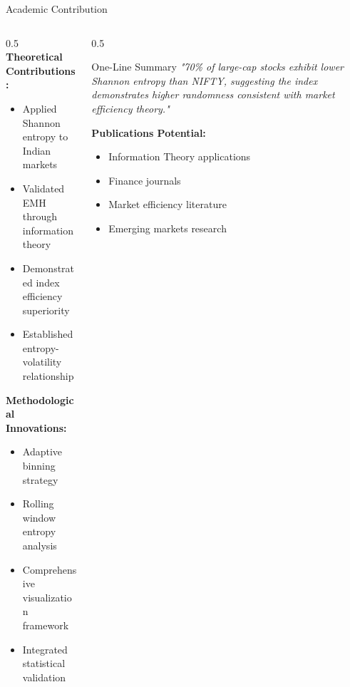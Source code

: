\documentclass[aspectratio=169,12pt,xcolor=table]{beamer}
\begin{document}
\begin{frame}{Academic Contribution}
\begin{columns}[T]
\begin{column}{0.5\textwidth}
    \textbf{Theoretical Contributions:}
    \begin{itemize}
        \item Applied Shannon entropy to Indian markets
        \item Validated EMH through information theory
        \item Demonstrated index efficiency superiority
        \item Established entropy-volatility relationship
    \end{itemize}
    
    \vspace{0.3cm}
    \textbf{Methodological Innovations:}
    \begin{itemize}
        \item Adaptive binning strategy
        \item Rolling window entropy analysis
        \item Comprehensive visualization framework
        \item Integrated statistical validation
    \end{itemize}
\end{column}

\begin{column}{0.5\textwidth}
    \begin{block}{One-Line Summary}
        \textit{"70\% of large-cap stocks exhibit lower Shannon entropy than NIFTY, suggesting the index demonstrates higher randomness consistent with market efficiency theory."}
    \end{block}
    
    \vspace{0.3cm}
    \textbf{Publications Potential:}
    \begin{itemize}
        \item Information Theory applications
        \item Finance journals
        \item Market efficiency literature
        \item Emerging markets research
    \end{itemize}
\end{column}
\end{columns}
\end{frame}
\end{document}
